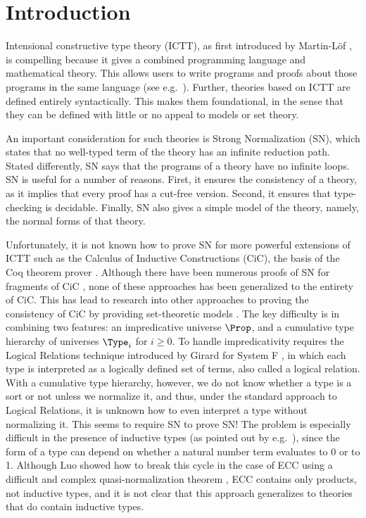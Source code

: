 \documentclass{article}
\begin{document}


\section{Introduction}

Intensional constructive type theory (ICTT), as first introduced by
Martin-L\"{o}f \cite{martinlof72}, is compelling because it gives a
combined programming language and mathematical theory. This allows
users to write programs and proofs about those programs in the same
language (see e.g.~\cite{nps90}). Further, theories based on ICTT are
defined entirely syntactically. This makes them foundational, in the
sense that they can be defined with little or no appeal to models
or set theory.

An important consideration for such theories is Strong Normalization
(SN), which states that no well-typed term of the theory has an
infinite reduction path. Stated differently, SN says that the programs
of a theory have no infinite loops. SN is useful for a number of
reasons. First, it ensures the consistency of a theory, as it implies
that every proof has a cut-free version. Second, it ensures that
type-checking is decidable. Finally, SN also gives a simple model of
the theory, namely, the normal forms of that theory.

Unfortunately, it is not known how to prove SN for more powerful
extensions of ICTT such as the Calculus of Inductive Constructions
(CiC), the basis of the Coq theorem prover \cite{coq}. Although there
have been numerous proofs of SN for fragments of CiC
\cite{geuvers94,goguen94,altenkirch93,geuvers91,luo90,coquand90}, none
of these approaches has been generalized to the entirety of CiC. This
has lead to research into other approaches to proving the consistency
of CiC by providing set-theoretic models
\cite{barras10,werner08,miquel02,miquel00,werner97,stefanova96}.
The key difficulty is in combining two features: an impredicative
universe $\Prop$, and a cumulative type hierarchy of universes
$\Type_i$ for $i\geq 0$.  To handle impredicativity requires the
Logical Relations technique introduced by Girard for System F
\cite{girard-proofs-types}, in which each type is interpreted as a
logically defined set of terms, also called a logical relation.  With
a cumulative type hierarchy, however, we do not know whether a type is
a sort or not unless we normalize it, and thus, under the standard
approach to Logical Relations, it is unknown how to even interpret a
type without normalizing it. This seems to require SN to prove SN! The
problem is especially difficult in the presence of inductive types (as
pointed out by e.g.~\cite{geuvers94}), since the form of a type can
depend on whether a natural number term evaluates to 0 or to
1. Although Luo showed how to break this cycle in the case of ECC
using a difficult and complex quasi-normalization theorem
\cite{luo90}, ECC contains only products, not inductive types, and it
is not clear that this approach generalizes to theories that do
contain inductive types.
\end{document}

